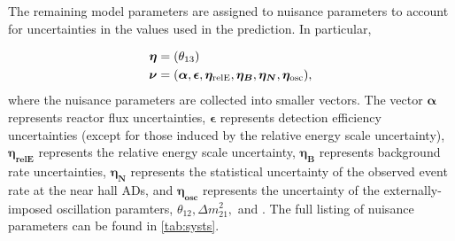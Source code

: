 The remaining model parameters
are assigned to nuisance parameters
to account for uncertainties in the values used in the prediction.
In particular,

\begin{align}
    \begin{split}
        \boldsymbol{\eta} &= (\theta_{13}) \\
        \boldsymbol{\nu} &= (
            \boldsymbol{\alpha},
            \boldsymbol{\epsilon},
            \boldsymbol{\eta_{\text{relE}}},
            \boldsymbol{\eta_B},
            \boldsymbol{\eta_N},
            \boldsymbol{\eta_{\text{osc}}}),
    \end{split}
\end{align}
where the nuisance parameters are collected into smaller vectors.
The vector $\boldsymbol{\alpha}$ represents reactor flux uncertainties,
$\boldsymbol{\epsilon}$ represents detection efficiency uncertainties
(except for those induced by the relative energy scale uncertainty),
$\boldsymbol{\eta_{\text{relE}}}$ represents the relative energy scale uncertainty,
$\boldsymbol{\eta_B}$ represents background rate uncertainties,
$\boldsymbol{\eta_N}$ represents the statistical uncertainty
of the observed event rate at the near hall ADs,
and $\boldsymbol{\eta_{\text{osc}}}$ represents the uncertainty
of the externally-imposed oscillation paramters, $\theta_{12}, \Delta m^2_{21},$
and \dmee{}.
The full listing of nuisance parameters
can be found in \cref{tab:systs}.

